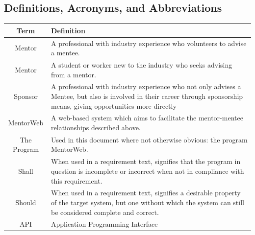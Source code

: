 \documentclass[11pt]{article}
\begin{document}
    \subsection{Definitions, Acronyms, and Abbreviations}
        \begin{center}
        \begin{longtable}{cp{10 cm}}
            Term                 & Definition \\ \hline
            Mentor\index{Mentor} & A professional with industry experience who
                                   volunteers to advise a mentee. \\ \hline
            Mentor\index{Mentee} & A student or worker new to the industry who
                                   seeks advising from a mentor. \\ \hline
            Sponsor\index{Sponsor}
                                 & A professional with industry experience who
                                   not only advises a Mentee, but also is
                                   involved in their career through sponsorship
                                   means, giving opportunities more directly
                                   \\ \hline
            MentorWeb\index{MentorWeb}
                                 & A web-based system which aims to facilitate
                                   the mentor\index{Mentor}-mentee\index{Mentee}
                                   relationships described above. \\ \hline
            The Program          & Used in this document where not otherwise
                                   obvious: the program MentorWeb. \\ \hline
            Shall                & When used in a requirement text, signifies
                                   that the program in question is incomplete or
                                   incorrect when not in compliance with this
                                   requirement. \\ \hline
            Should               & When used in a requirement text, signifies
                                   a desirable property of the target system,
                                   but one without which the system can still be
                                   considered complete and correct. \\ \hline
            API                  & Application Programming Interface \\ \hline
        \end{longtable}
        \end{center}
\end{document}
